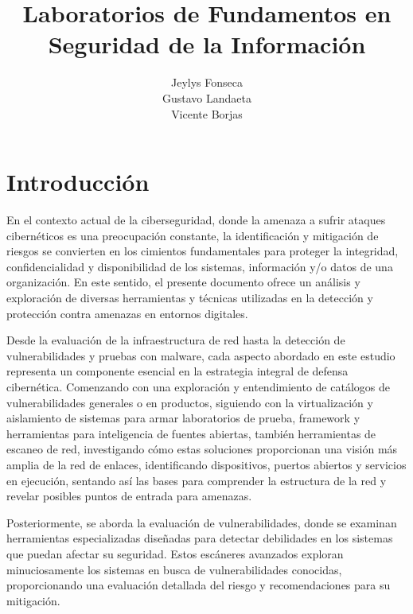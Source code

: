 \documentclass[stu, 11pt, letterpaper, donotrepeattitle, floatsintext, natbib]{apa7}
\title{\Large Laboratorios de Fundamentos en Seguridad de la Información}
\author{Jeylys Fonseca \\Gustavo Landaeta \\Vicente Borjas} %
\begin{document}
\maketitle


\renewcommand\contentsname{\largeÍndice}
\tableofcontents
\setcounter{tocdepth}{2}
\newpage
\renewcommand{\listfigurename}{\largeÍndice de fíguras}
\listoffigures
\newpage
\renewcommand{\listtablename}{\largeÍndice de tablas}
\listoftables
\newpage


\section{\large Introducción}

\justify

\hspace{1.27cm} En el contexto actual de la ciberseguridad, donde la amenaza a sufrir ataques cibernéticos es una preocupación constante, la identificación y mitigación de riesgos se convierten en los cimientos fundamentales para proteger la integridad, confidencialidad y disponibilidad de los sistemas, información y/o datos de una organización. En este sentido, el presente documento ofrece un análisis y exploración de diversas herramientas y técnicas utilizadas en la detección y protección contra amenazas en entornos digitales.  

Desde la evaluación de la infraestructura de red hasta la detección de vulnerabilidades y pruebas con malware, cada aspecto abordado en este estudio representa un componente esencial en la estrategia integral de defensa cibernética. Comenzando con una exploración y entendimiento de catálogos de vulnerabilidades generales o en productos, siguiendo con la virtualización y aislamiento de sistemas para armar laboratorios de prueba, framework y herramientas para inteligencia de fuentes abiertas, también herramientas de escaneo de red, investigando cómo estas soluciones proporcionan una visión más amplia de la red de enlaces, identificando dispositivos, puertos abiertos y servicios en ejecución, sentando así las bases para comprender la estructura de la red y revelar posibles puntos de entrada para amenazas.  

Posteriormente, se aborda la evaluación de vulnerabilidades, donde se examinan herramientas especializadas diseñadas para detectar debilidades en los sistemas que puedan afectar su seguridad. Estos escáneres avanzados exploran minuciosamente los sistemas en busca de vulnerabilidades conocidas, proporcionando una evaluación detallada del riesgo y recomendaciones para su mitigación.  
\end{document}
